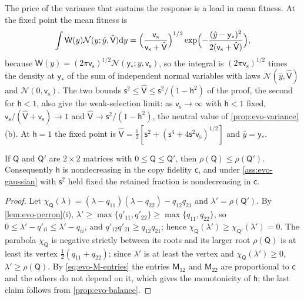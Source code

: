 The price of the variance that sustains the response is a load in mean fitness. At the fixed point the mean fitness is
\begin{equation}\label{eq:evo-balance-fitness}
\int\mathsf W(y)\mathcal N(y;\hat y,\hat{\mathsf V})\mathrm dy=\Bigl(\frac{\mathsf v_{\mathrm s}}{\mathsf v_{\mathrm s}+\hat{\mathsf V}}\Bigr)^{1/2}\exp\Bigl(-\frac{(\hat y-\mathsf y_\ast)^2}{2(\mathsf v_{\mathrm s}+\hat{\mathsf V})}\Bigr),
\end{equation}
because $\mathsf W(y)=(2\pi\mathsf v_{\mathrm s})^{1/2}\mathcal N(\mathsf y_\ast;y,\mathsf v_{\mathrm s})$, so the integral is $(2\pi\mathsf v_{\mathrm s})^{1/2}$ times the density at $\mathsf y_\ast$ of the sum of independent normal variables with laws $\mathcal N(\hat y,\hat{\mathsf V})$ and $\mathcal N(0,\mathsf v_{\mathrm s})$. The two bounds $\mathsf s^2\le\hat{\mathsf V}\le\mathsf s^2/(1-\mathsf h^2)$ of the proof, the second for $\mathsf h<1$, also give the weak-selection limit: as $\mathsf v_{\mathrm s}\to\infty$ with $\mathsf h<1$ fixed, $\mathsf v_{\mathrm s}/(\hat{\mathsf V}+\mathsf v_{\mathrm s})\to1$ and $\hat{\mathsf V}\to\mathsf s^2/(1-\mathsf h^2)$, the neutral value of \cref{prop:evo-variance}(b). At $\mathsf h=1$ the fixed point is $\hat{\mathsf V}=\frac12[\mathsf s^2+(\mathsf s^4+4\mathsf s^2\mathsf v_{\mathrm s})^{1/2}]$ and $\hat y=\mathsf y_\ast$.

\begin{lemma}\label{lem:evo-monotone}
If $\mathsf Q$ and $\mathsf Q'$ are $2\times2$ matrices with $0\le\mathsf Q\le\mathsf Q'$, then $\rho(\mathsf Q)\le\rho(\mathsf Q')$. Consequently $\mathsf h$ is nondecreasing in the copy fidelity $\mathsf c$, and under \cref{ass:evo-gaussian} with $\mathsf s^2$ held fixed the retained fraction is nondecreasing in $\mathsf c$.
\end{lemma}

\begin{proof}
Let $\chi_{\mathsf Q}(\lambda)=(\lambda-q_{11})(\lambda-q_{22})-q_{12}q_{21}$ and $\lambda'=\rho(\mathsf Q')$. By \cref{lem:evo-perron}(i), $\lambda'\ge\max\{q'_{11},q'_{22}\}\ge\max\{q_{11},q_{22}\}$, so $0\le\lambda'-q'_{ii}\le\lambda'-q_{ii}$, and $q'_{12}q'_{21}\ge q_{12}q_{21}$; hence $\chi_{\mathsf Q}(\lambda')\ge\chi_{\mathsf Q'}(\lambda')=0$. The parabola $\chi_{\mathsf Q}$ is negative strictly between its roots and its larger root $\rho(\mathsf Q)$ is at least its vertex $\frac12(q_{11}+q_{22})$; since $\lambda'$ is at least the vertex and $\chi_{\mathsf Q}(\lambda')\ge0$, $\lambda'\ge\rho(\mathsf Q)$. By \eqref{eq:evo-M-entries} the entries $\mathsf M_{12}$ and $\mathsf M_{22}$ are proportional to $\mathsf c$ and the others do not depend on it, which gives the monotonicity of $\mathsf h$; the last claim follows from \cref{prop:evo-balance}.
\end{proof}

